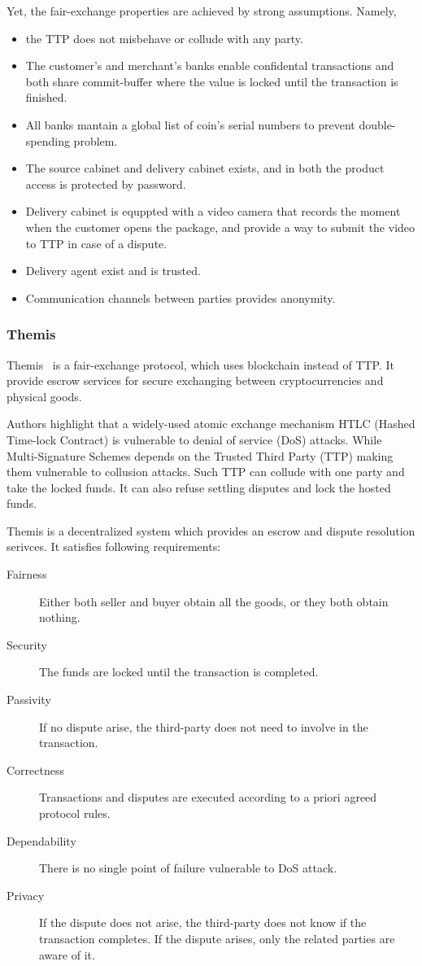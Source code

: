 \documentclass{article}
\begin{document}
Yet, the fair-exchange properties are achieved by strong assumptions. Namely, 
\begin{itemize}
    \item the TTP does not misbehave or collude with any party. 
    \item The customer's and merchant's banks enable confidental transactions and both share commit-buffer where the value is locked until the transaction is finished.   
    \item All banks mantain a global list of coin's serial numbers to prevent double-spending problem. 
    \item The source cabinet and delivery cabinet exists, and in both the product access is protected by password.
    \item Delivery cabinet is equppted with a video camera that records the moment when the customer opens the package, and provide a way to submit the video to TTP in case of a dispute. 
    \item Delivery agent exist and is trusted. 
    \item Communication channels between parties provides anonymity.
\end{itemize}

\subsubsection{Themis} Themis~\cite{meng2019themis} is a fair-exchange protocol, which uses blockchain instead of TTP. It provide escrow services for secure exchanging between cryptocurrencies and physical goods.

Authors highlight that a widely-used atomic exchange mechanism HTLC (Hashed Time-lock Contract) is vulnerable to denial of service (DoS) attacks. While Multi-Signature Schemes depends on the Trusted Third Party (TTP) making them vulnerable to collusion attacks. Such TTP can collude with one party and take the locked funds. It can also refuse settling disputes and lock the hosted funds. 

Themis is a decentralized system which provides an escrow and dispute resolution serivces. It satisfies following requirements:
\begin{description}
    \item[Fairness] Either both seller and buyer obtain all the goods, or they both obtain nothing.
    \item[Security] The funds are locked until the transaction is completed.
    \item[Passivity] If no dispute arise, the third-party does not need to involve in the transaction.
    \item[Correctness] Transactions and disputes are executed according to a priori agreed protocol rules.
    \item[Dependability] There is no single point of failure vulnerable to DoS attack.
    \item[Privacy] If the dispute does not arise, the third-party does not know if the transaction completes. If the dispute arises, only the related parties are aware of it.    
\end{description}
\end{document}
